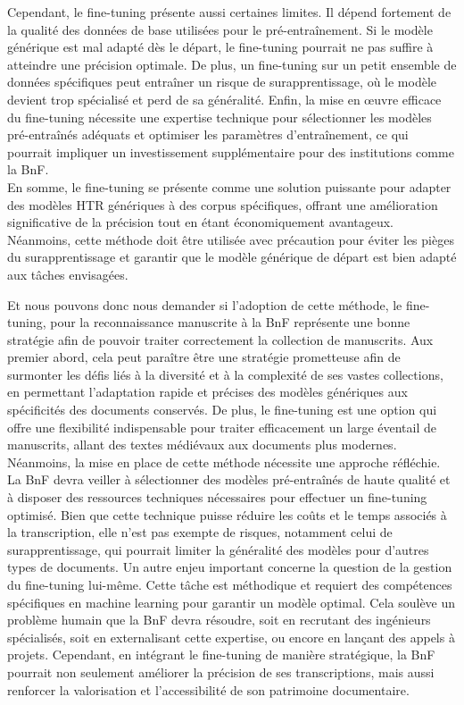 \documentclass[a4paper,12pt,twoside]{book}
\begin{document}
	Cependant, le fine-tuning présente aussi certaines limites. Il dépend fortement de la qualité des données de base utilisées pour le pré-entraînement. Si le modèle générique est mal adapté dès le départ, le fine-tuning pourrait ne pas suffire à atteindre une précision optimale. De plus, un fine-tuning sur un petit ensemble de données spécifiques peut entraîner un risque de surapprentissage, où le modèle devient trop spécialisé et perd de sa généralité. Enfin, la mise en œuvre efficace du fine-tuning nécessite une expertise technique pour sélectionner les modèles pré-entraînés adéquats et optimiser les paramètres d’entraînement, ce qui pourrait impliquer un investissement supplémentaire pour des institutions comme la BnF.
	\\
	
	En somme, le fine-tuning se présente comme une solution puissante pour adapter des modèles HTR génériques à des corpus spécifiques, offrant une amélioration significative de la précision tout en étant économiquement avantageux. Néanmoins, cette méthode doit être utilisée avec précaution pour éviter les pièges du surapprentissage et garantir que le modèle générique de départ est bien adapté aux tâches envisagées. 
	
	Et nous pouvons donc nous demander si l’adoption de cette méthode, le fine-tuning, pour la reconnaissance manuscrite à la BnF représente une bonne stratégie afin de pouvoir traiter correctement la collection de manuscrits. Aux premier abord, cela peut paraître être une stratégie prometteuse afin de surmonter les défis liés à la diversité et à la complexité de ses vastes collections, en permettant l’adaptation rapide et précises des modèles génériques aux spécificités des documents conservés. De plus, le fine-tuning est une option qui offre une flexibilité indispensable pour traiter efficacement un large éventail de manuscrits, allant des textes médiévaux aux documents plus modernes. 
	\\
	
	Néanmoins, la mise en place de cette méthode nécessite une approche réfléchie. La BnF devra veiller à sélectionner des modèles pré-entraînés de haute qualité et à disposer des ressources techniques nécessaires pour effectuer un fine-tuning optimisé. Bien que cette technique puisse réduire les coûts et le temps associés à la transcription, elle n’est pas exempte de risques, notamment celui de surapprentissage, qui pourrait limiter la généralité des modèles pour d’autres types de documents. Un autre enjeu important concerne la question de la gestion du fine-tuning lui-même. Cette tâche est méthodique et requiert des compétences spécifiques en machine learning pour garantir un modèle optimal. Cela soulève un problème humain que la BnF devra résoudre, soit en recrutant des ingénieurs spécialisés, soit en externalisant cette expertise, ou encore en lançant des appels à projets. Cependant, en intégrant le fine-tuning de manière stratégique, la BnF pourrait non seulement améliorer la précision de ses transcriptions, mais aussi renforcer la valorisation et l’accessibilité de son patrimoine documentaire. 
	
\end{document}
